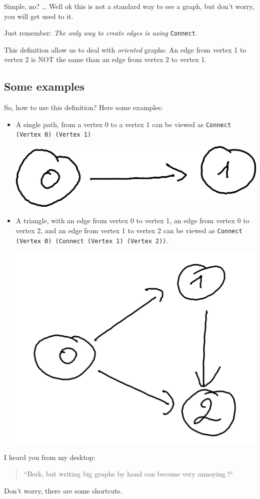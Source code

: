 \documentclass[10pt,a4paper]{article}
\begin{document}
Simple, no?
\ldots
Well ok this is not a standard way to see a graph, but don't worry, you will get used to it.

Just remember: \emph{The only way to create edges is using} \verb|Connect|.

This definition allow us to deal with \emph{oriented} graphs: An edge from vertex 1 to vertex 2 is NOT the same than an edge from vertex 2 to vertex 1.

\subsection{Some examples}

So, how to use this definition? Here some examples:

\begin{itemize}
	\item A single path, from a vertex 0 to a vertex 1 can be viewed as \verb|Connect (Vertex 0) (Vertex 1)| 
	\begin{center}
	\includegraphics[scale=0.5]{figspng/e2.png}
	\end{center}
	\item A triangle, with an edge from vertex 0 to vertex 1, an edge from vertex 0 to vertex 2, and an edge from vertex 1 to vertex 2 can be viewed as \verb|Connect (Vertex 0) (Connect (Vertex 1) (Vertex 2))|.
	\begin{center}
	\includegraphics[scale=0.5]{figspng/e1.png}
	\end{center}

\end{itemize}
I heard you from my desktop:
\begin{quote}
	``Berk, but writing big graphs by hand can become very annoying !``
\end{quote}
Don't worry, there are some shortcuts.
\end{document}
